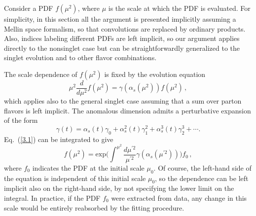 Consider a PDF $f(\mu^2)$, where $\mu$ is  the scale at which the
PDF is evaluated. For simplicity, in this section all the argument is 
presented implicitly assuming a Mellin space formalism, so that 
convolutions are replaced by ordinary products.
%
Also, indices labeling different PDFs are left implicit,
so our argument applies directly to the
nonsinglet case but can be straightforwardly generalized to the singlet
evolution and to other flavor combinations.

The scale dependence of $f(\mu^2)$ is fixed by the evolution equation
%
\begin{equation} \label{3.1}
	\mu^2 \frac{d}{d \mu^2} f(\mu^2) = \gamma(\alpha_s(\mu^2)) f(\mu^2)\, ,
\end{equation}
which applies also to the general singlet case assuming that a
sum over parton flavors is left implicit.
%
The anomalous dimension admits a perturbative expansion of the form
\begin{equation}\label{3.3a} 
\gamma(t) =  \alpha_s(t) \gamma_0 + \alpha_s^2(t) \gamma_1^2  + \alpha_s^3(t) \gamma_2^3 + \cdots .
\end{equation}
Eq.~(\ref{3.1}) can be integrated to give
%
\begin{equation} \label{3.2}
	f(\mu^2) = \text{exp}\bigg(\int^{\mu^2} \frac{d \mu^{'2}}{\mu^{'2}} \gamma(\alpha_s(\mu^{'2}))\bigg) f_0 \, ,
\end{equation}
%
where $f_0$ indicates the PDF at the initial scale $\mu_0$.
%
Of course, the left-hand
side of the equation  is
independent of this initial scale $\mu_0$, so  the dependence  can be left
implicit also on the right-hand side, by not specifying the lower
limit on the integral. In practice, if the PDF $f_0$ were extracted from
data, any change in this scale would be entirely reabsorbed by the fitting
procedure.

